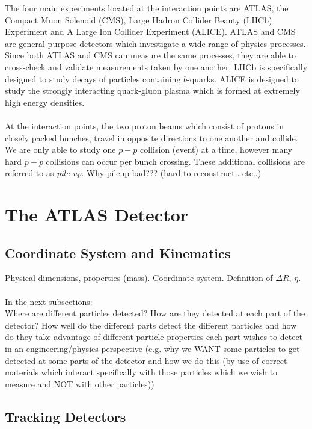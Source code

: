 The four main experiments located at the interaction points are ATLAS, the Compact Muon Solenoid (CMS), Large Hadron Collider Beauty (LHCb) Experiment and A Large Ion Collider Experiment (ALICE). ATLAS and CMS are general-purpose detectors which investigate a wide range of physics processes. Since both ATLAS and CMS can measure the same processes, they are able to cross-check and validate measurements taken by one another. LHCb is specifically designed to study decays of particles containing $b$-quarks. ALICE is designed to study the strongly interacting quark-gluon plasma which is formed at extremely high energy densities.\\\\

At the interaction points, the two proton beams which consist of protons in closely packed bunches, travel in opposite directions to one another and collide. We are only able to study one $p-p$ collision (event) at a time, however many hard $p-p$ collisions can occur per bunch crossing. These additional collisions are referred to as \textit{pile-up}. Why pileup bad??? (hard to reconstruct.. etc..)







\section{The ATLAS Detector}
\subsection{Coordinate System and Kinematics}
Physical dimensions, properties (mass). Coordinate system. Definition of $\Delta R$, $\eta$.\\\\
In the next subsections:\\
Where are different particles detected? How are they detected at each part of the detector? How well do the different parts detect the different particles and how do they take advantage of different particle properties each part wishes to detect in an engineering/physics perspective (e.g. why we WANT some particles to get detected at some parts of the detector and how we do this (by use of correct materials which interact specifically with those particles which we wish to measure and NOT with other particles))

\subsection{Tracking Detectors}
